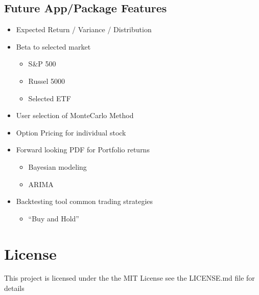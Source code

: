 \documentclass[letterpaper,10pt,english]{sphinxmanual}
\begin{document}
\subsection{Future App/Package Features}
\label{\detokenize{readme:future-app-package-features}}\begin{itemize}
\item {} 
\sphinxAtStartPar
Expected Return / Variance / Distribution

\item {} 
\sphinxAtStartPar
Beta to selected market
\begin{itemize}
\item {} 
\sphinxAtStartPar
S\&P 500

\item {} 
\sphinxAtStartPar
Russel 5000

\item {} 
\sphinxAtStartPar
Selected ETF

\end{itemize}

\item {} 
\sphinxAtStartPar
User selection of MonteCarlo Method

\item {} 
\sphinxAtStartPar
Option Pricing for individual stock

\item {} 
\sphinxAtStartPar
Forward looking PDF for Portfolio returns
\begin{itemize}
\item {} 
\sphinxAtStartPar
Bayesian modeling

\item {} 
\sphinxAtStartPar
ARIMA

\end{itemize}

\item {} 
\sphinxAtStartPar
Backtesting tool \sphinxhyphen{} common trading strategies
\begin{itemize}
\item {} 
\sphinxAtStartPar
“Buy and Hold”

\end{itemize}

\end{itemize}


\section{License}
\label{\detokenize{readme:license}}
\sphinxAtStartPar
This project is licensed under the the MIT License \sphinxhyphen{} see the LICENSE.md
file for details
\end{document}
